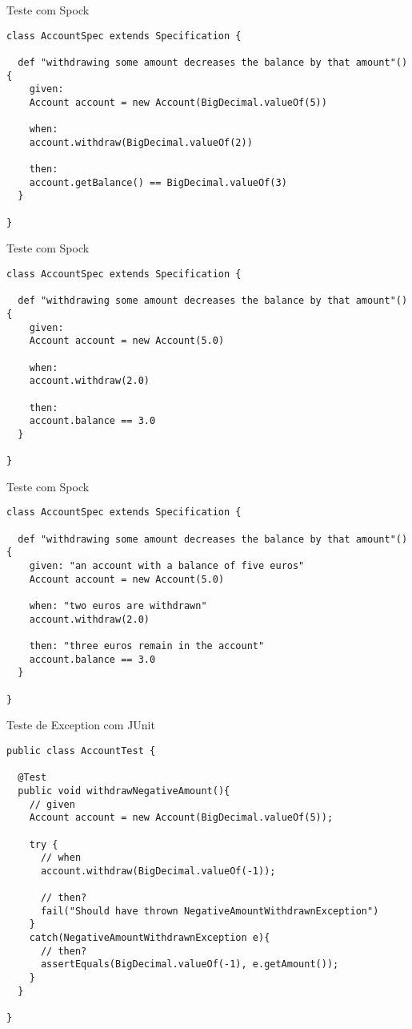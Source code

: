 \documentclass{beamer}
\begin{document}
\begin{frame}[fragile]{Teste com Spock}
 \begin{verbatim}
class AccountSpec extends Specification {
  
  def "withdrawing some amount decreases the balance by that amount"(){
    given:
    Account account = new Account(BigDecimal.valueOf(5))
    
    when:
    account.withdraw(BigDecimal.valueOf(2))
    
    then:
    account.getBalance() == BigDecimal.valueOf(3) 
  }
  
}
  \end{verbatim}
\end{frame}

\begin{frame}[fragile]{Teste com Spock}
 \begin{verbatim}
class AccountSpec extends Specification {
  
  def "withdrawing some amount decreases the balance by that amount"(){
    given:
    Account account = new Account(5.0)
    
    when:
    account.withdraw(2.0)
    
    then:
    account.balance == 3.0
  }
  
}
  \end{verbatim}
\end{frame}

\begin{frame}[fragile]{Teste com Spock}
 \begin{verbatim}
class AccountSpec extends Specification {
  
  def "withdrawing some amount decreases the balance by that amount"(){
    given: "an account with a balance of five euros"
    Account account = new Account(5.0)
    
    when: "two euros are withdrawn"
    account.withdraw(2.0)
    
    then: "three euros remain in the account"
    account.balance == 3.0
  }
  
}
  \end{verbatim}
\end{frame}

\begin{frame}[fragile]{Teste de Exception com JUnit}
 \begin{verbatim}
public class AccountTest {

  @Test
  public void withdrawNegativeAmount(){
    // given
    Account account = new Account(BigDecimal.valueOf(5));
    
    try {
      // when
      account.withdraw(BigDecimal.valueOf(-1));
      
      // then?
      fail("Should have thrown NegativeAmountWithdrawnException")
    }
    catch(NegativeAmountWithdrawnException e){
      // then?
      assertEquals(BigDecimal.valueOf(-1), e.getAmount());
    }
  }
  
}
  \end{verbatim}
\end{frame}
\end{document}
